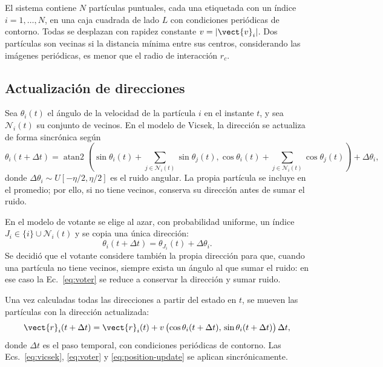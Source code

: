 \documentclass[11pt,a4paper]{article}
\newcommand{\noise}{\ensuremath{\eta}}
\begin{document}
El sistema contiene $N$ partículas puntuales, cada una etiquetada con un
índice $i=1,\dots,N$, en una caja cuadrada de lado $L$
con condiciones periódicas de contorno. Todas se desplazan con rapidez
constante $v=|\vect{v}_i|$. Dos partículas son vecinas si la distancia mínima entre sus
centros, considerando las imágenes periódicas, es menor que el radio de
interacción $r_c$.

\subsection{Actualización de direcciones}

Sea $\theta_i(t)$ el ángulo de la velocidad de la partícula $i$ en el instante
$t$, y sea $\mathcal{N}_i(t)$ su conjunto de vecinos. En el modelo de Vicsek,
la dirección se actualiza de forma sincrónica según
\begin{equation}
\theta_i(t+\Delta t) =
\operatorname{atan2}\left(
\sin\theta_i(t)+\sum_{j\in\mathcal{N}_i(t)}\sin\theta_j(t),
\cos\theta_i(t)+\sum_{j\in\mathcal{N}_i(t)}\cos\theta_j(t)
\right) + \Delta\theta_i,
\label{eq:vicsek}
\end{equation}
donde $\Delta\theta_i\sim U[-\noise/2,\noise/2]$ es el ruido angular. La
propia partícula se incluye en el promedio; por ello, si no tiene vecinos,
conserva su dirección antes de sumar el ruido.

En el modelo de votante se elige al azar, con probabilidad uniforme, un
índice $J_i\in\{i\}\cup\mathcal{N}_i(t)$ y se copia una única dirección:
\begin{equation}
    \theta_i(t+\Delta t) = \theta_{J_i}(t) + \Delta\theta_i.
    \label{eq:voter}
\end{equation}
Se decidió que el votante considere también la propia dirección para que,
cuando una partícula no tiene vecinos, siempre exista un ángulo al que sumar
el ruido: en ese caso la Ec.~\eqref{eq:voter} se reduce a conservar la
dirección y sumar ruido.

Una vez calculadas todas las direcciones a partir del estado en $t$, se mueven
las partículas con la dirección actualizada:
\begin{equation}
    \vect{r}_i(t+\Delta t) =
    \vect{r}_i(t) + v\,\bigl(\cos\theta_i(t+\Delta t),\,\sin\theta_i(t+\Delta t)\bigr)\,\Delta t,
    \label{eq:position-update}
\end{equation}
donde $\Delta t$ es el paso temporal, con condiciones periódicas de contorno.
Las Ecs.~\eqref{eq:vicsek},
\eqref{eq:voter} y \eqref{eq:position-update} se aplican sincrónicamente.
\end{document}
